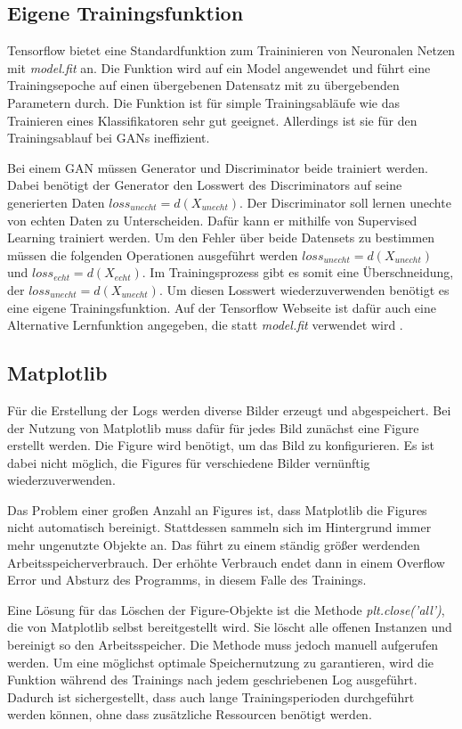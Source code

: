 \subsection{Eigene Trainingsfunktion}
Tensorflow bietet eine Standardfunktion zum Traininieren von Neuronalen Netzen mit \textit{model.fit} an.
Die Funktion wird auf ein Model angewendet und führt eine Trainingsepoche auf einen übergebenen Datensatz mit zu übergebenden Parametern durch.
Die Funktion ist für simple Trainingsabläufe wie das Trainieren eines Klassifikatoren sehr gut geeignet.
Allerdings ist sie für den Trainingsablauf bei GANs ineffizient.

Bei einem GAN müssen Generator und Discriminator beide trainiert werden.
Dabei benötigt der Generator den Losswert des Discriminators auf seine generierten Daten $loss_{unecht} = d(X_{unecht})$.
Der Discriminator soll lernen unechte von echten Daten zu Unterscheiden.
Dafür kann er mithilfe von Supervised Learning trainiert werden.
Um den Fehler über beide Datensets zu bestimmen müssen die folgenden Operationen ausgeführt werden $loss_{unecht} = d(X_{unecht})$ und $loss_{echt} = d(X_{echt})$.
Im Trainingsprozess gibt es somit eine Überschneidung, der $loss_{unecht} = d(X_{unecht})$.
Um diesen Losswert wiederzuverwenden benötigt es eine eigene Trainingsfunktion.
Auf der Tensorflow Webseite ist dafür auch eine Alternative Lernfunktion angegeben, die statt \textit{model.fit} verwendet wird \cite{tensorflow-gan-learn-step}.

\subsection{Matplotlib}
Für die Erstellung der Logs werden diverse Bilder erzeugt und abgespeichert.
Bei der Nutzung von Matplotlib muss dafür für jedes Bild zunächst eine Figure erstellt werden.
Die Figure wird benötigt, um das Bild zu konfigurieren.
Es ist dabei nicht möglich, die Figures für verschiedene Bilder vernünftig wiederzuverwenden.

Das Problem einer großen Anzahl an Figures ist, dass Matplotlib die Figures nicht automatisch bereinigt.
Stattdessen sammeln sich im Hintergrund immer mehr ungenutzte Objekte an.
Das führt zu einem ständig größer werdenden Arbeitsspeicherverbrauch.
Der erhöhte Verbrauch endet dann in einem Overflow Error und Absturz des Programms, in diesem Falle des Trainings.

Eine Lösung für das Löschen der Figure-Objekte ist die Methode \textit{plt.close('all')}, die von Matplotlib selbst bereitgestellt wird.
Sie löscht alle offenen Instanzen und bereinigt so den Arbeitsspeicher.
Die Methode muss jedoch manuell aufgerufen werden.
Um eine möglichst optimale Speichernutzung zu garantieren, wird die Funktion während des Trainings nach jedem geschriebenen Log ausgeführt.
Dadurch ist sichergestellt, dass auch lange Trainingsperioden durchgeführt werden können, ohne dass zusätzliche Ressourcen benötigt werden.

